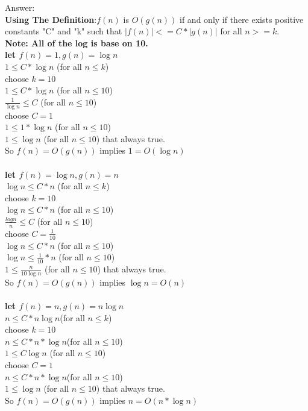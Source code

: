 \documentclass[12pt]{article}
\begin{document}
\begin{enumerate}
\begin{enumerate}
	{\color{blue}Answer:
	\\\textbf{Using The Definition}:$f(n)$ is $O(g(n))$ if and only if there exists positive constants "C" and "k" such that $|f(n)| <= C * |g(n)|$ for all $n >= k$.
	\\\textbf{Note: All of the log is base on 10.}
	\\ \textbf{let $f(n) = 1, g(n) = \log n$}
	\\ $1 \le C*\log n$ (for all $n\le k$) 
	\\ choose $k=10$
	\\$1 \le C*\log n$ (for all $n\le 10$)
	\\ $\frac{1}{\log n} \le C$ (for all $n\le 10$)
	\\ choose $C=1$
	\\ $1 \le 1*\log n$ (for all $n\le 10$)
	\\ $1 \le \log n$ (for all $n\le 10$) that always true.
	\\ So $f(n) = O(g(n))$ implies $1 = O(\log n)$
	\\
	\\ \textbf{let $f(n)=\log n, g(n) = n$}
	\\ $\log n \le C*n$ (for all $n\le k$)
	\\ choose $k=10$
	\\ $\log n \le C*n$ (for all $n\le 10$)
	\\ $\frac{log n}{n} \le C$ (for all $n\le 10$)
	\\ choose $C = \frac{1}{10}$
	\\ $\log n \le C*n$ (for all $n\le 10$)
	\\ $\log n \le \frac{1}{10}*n$ (for all $n\le 10$)
	\\ $1 \le \frac{n}{10\log n}$ (for all $n\le 10$) that always true.
	\\ So $f(n) = O(g(n))$ implies $\log n = O(n)$
	\\
	\\ \textbf{let $f(n)= n, g(n) = n\log n$}
	\\ $n \le C*n\log n$(for all $n\le k$)
	\\ choose $k =10$
	\\ $n \le C* n* \log n$(for all $n\le 10$)
	\\ $1 \le C\log n$ (for all $n\le 10$)
	\\ choose $ C=1$
	\\ $n \le C* n* \log n$(for all $n\le10$)
	\\ $1 \le \log n$ (for all $n\le 10$) that always true.
	\\ So $f(n) = O(g(n))$ implies $n = O(n* \log n)$
}
\end{enumerate}
\end{enumerate}
\end{document}
